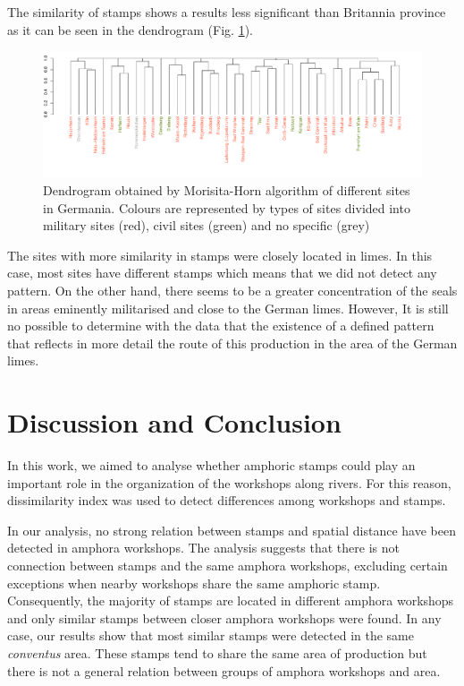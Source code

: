 \documentclass[review]{elsarticle}
\begin{document}
The similarity of stamps shows a results less significant than Britannia province as it can be seen in the dendrogram (Fig. \ref{germap}). 

\begin{figure}[htp]
	\centering
\includegraphics[width=\linewidth]{figs/dendroger5.pdf}
\caption{Dendrogram obtained by Morisita-Horn algorithm of different sites in Germania. Colours are represented by types of sites divided into military sites (red), civil sites (green) and no specific (grey)}
\label{germap}
\end{figure}


The sites with more similarity in stamps were closely located in limes. In this case, most sites have different stamps  which means that we did not detect any pattern. On the other hand, there seems to be a greater concentration of the seals in areas eminently militarised and close to the German limes. However, It is still no possible to determine with the data that the existence of a defined pattern that reflects in more detail the route of this production in the area of the German limes.


\section{Discussion and Conclusion}


In this work, we aimed to analyse whether amphoric stamps could play an important role in the organization of the workshops along rivers. For this reason, dissimilarity index was used to detect differences among workshops and stamps. 

In our analysis, no strong relation between stamps and spatial distance have been detected in amphora workshops. The analysis suggests that there is not connection between stamps and the same amphora workshops, excluding certain exceptions when nearby workshops share the same amphoric stamp. Consequently, the majority of stamps are located in different amphora workshops and only similar stamps between closer amphora workshops were found. In any case, our results show that most similar stamps were detected in the same \textit{conventus} area. These stamps tend to share the same area of production but there is not a general relation between groups of amphora workshops and area. 
\end{document}
